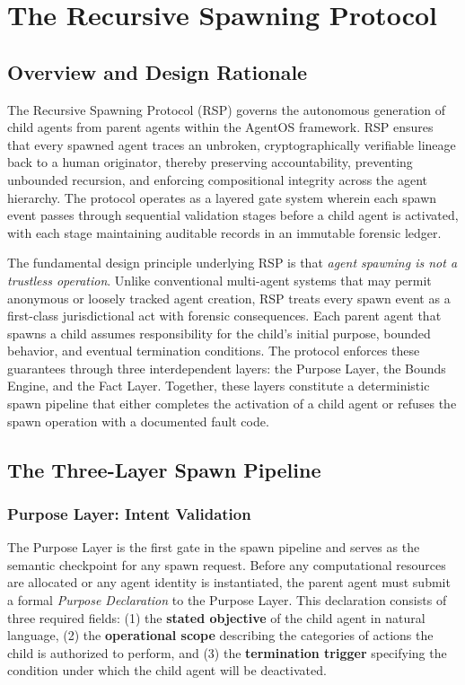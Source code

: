 \section{The Recursive Spawning Protocol}

\subsection{Overview and Design Rationale}

The Recursive Spawning Protocol (RSP) governs the autonomous generation of child agents from parent agents within the AgentOS framework. RSP ensures that every spawned agent traces an unbroken, cryptographically verifiable lineage back to a human originator, thereby preserving accountability, preventing unbounded recursion, and enforcing compositional integrity across the agent hierarchy. The protocol operates as a layered gate system wherein each spawn event passes through sequential validation stages before a child agent is activated, with each stage maintaining auditable records in an immutable forensic ledger.

The fundamental design principle underlying RSP is that \emph{agent spawning is not a trustless operation}. Unlike conventional multi-agent systems that may permit anonymous or loosely tracked agent creation, RSP treats every spawn event as a first-class jurisdictional act with forensic consequences. Each parent agent that spawns a child assumes responsibility for the child's initial purpose, bounded behavior, and eventual termination conditions. The protocol enforces these guarantees through three interdependent layers: the Purpose Layer, the Bounds Engine, and the Fact Layer. Together, these layers constitute a deterministic spawn pipeline that either completes the activation of a child agent or refuses the spawn operation with a documented fault code.

\subsection{The Three-Layer Spawn Pipeline}

\subsubsection{Purpose Layer: Intent Validation}

The Purpose Layer is the first gate in the spawn pipeline and serves as the semantic checkpoint for any spawn request. Before any computational resources are allocated or any agent identity is instantiated, the parent agent must submit a formal \emph{Purpose Declaration} to the Purpose Layer. This declaration consists of three required fields: (1) the \textbf{stated objective} of the child agent in natural language, (2) the \textbf{operational scope} describing the categories of actions the child is authorized to perform, and (3) the \textbf{termination trigger} specifying the condition under which the child agent will be deactivated.

